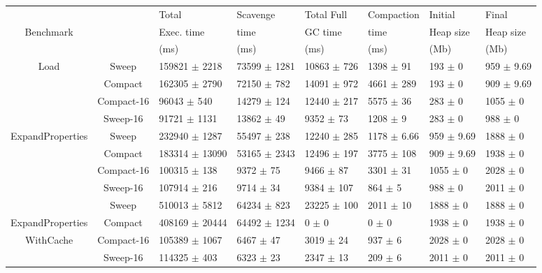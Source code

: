\documentclass[10pt, sigplan]{acmart}
\begin{document}
\begin{figure}[thb]
\begin{tabular}{|c|c|l|l|l|l|l|l|}
   \hline
  & & Total   & Scavenge  & Total Full  & Compaction  & Initial  & Final \\
 Benchmark & &  Exec. time &  time & GC time &  time &  Heap size & Heap size \\
  & &  (ms) &  (ms) & (ms) &  (ms) &  (Mb) &  (Mb) \\
   \hline
   \multirow{4}{*}{Load} & Sweep 	& 159821 $\pm$ 2218 &	73599 $\pm$ 1281 	& 10863 $\pm$ 726 	&1398 $\pm$ 91 	& 193 $\pm$ 0 	& 959 $\pm$ 9.69 \\
    				    & Compact 	& 162305 $\pm$ 2790 &	72150 $\pm$ 782 	& 14091 $\pm$ 972 	&4661 $\pm$ 289 	& 193 $\pm$ 0 	& 909 $\pm$ 9.69 \\
    				    & Compact-16 	& 96043 $\pm$ 540 &	14279 $\pm$ 124 	& 12440 $\pm$ 217 	&5575 $\pm$ 36 	& 283 $\pm$ 0 	& 1055 $\pm$ 0 \\
    				    & Sweep-16 		& 91721 $\pm$ 1131 &	13862 $\pm$ 49 	& 9352 $\pm$ 73 	&1208 $\pm$ 9 	& 283 $\pm$ 0 	& 988 $\pm$ 0 \\
   \hline
   \multirow{4}{*}{ExpandProperties} 	& Sweep 		& 232940 $\pm$ 1287 &	55497 $\pm$ 238 	& 12240 $\pm$ 285 	&1178 $\pm$ 6.66 	& 959 $\pm$ 9.69 & 1888 $\pm$ 0 \\
    				    			& Compact 	& 183314 $\pm$ 13090 &	53165 $\pm$ 2343 	& 12496 $\pm$ 197 	&3775 $\pm$ 108 	& 909 $\pm$ 9.69 & 1938 $\pm$ 0 \\
    				    & Compact-16 	& 100315 $\pm$ 138 &	9372 $\pm$ 75 	& 9466 $\pm$ 87 	&3301 $\pm$ 31 	& 1055 $\pm$ 0 	& 2028 $\pm$ 0 \\
    				    & Sweep-16 		& 107914 $\pm$ 216 &	9714 $\pm$ 34 	& 9384 $\pm$ 107 	&864 $\pm$ 5 	& 988 $\pm$ 0 	& 2011 $\pm$ 0 \\
   \hline
    					& Sweep 		& 510013 $\pm$ 5812 	&	64234 $\pm$ 823 	& 23225 $\pm$ 100 	&2011 $\pm$ 10 	& 1888 $\pm$ 0 	& 1888 $\pm$ 0 \\
     	ExpandProperties	& Compact 	& 408169 $\pm$ 20444 	&	64492 $\pm$ 1234 	& 0 $\pm$ 0 		&0 $\pm$ 0 		& 1938 $\pm$ 0 	& 1938 $\pm$ 0 \\
    		WithCache	& Compact-16 	& 105389 $\pm$ 1067 	&	6467 $\pm$ 47 		& 3019 $\pm$ 24 	&937 $\pm$ 6 		& 2028 $\pm$ 0 	& 2028 $\pm$ 0 \\
    				    	& Sweep-16 	& 114325 $\pm$ 403 	&	6323 $\pm$ 23 		& 2347 $\pm$ 13 	&209 $\pm$ 6 		& 2011 $\pm$ 0 	& 2011 $\pm$ 0 \\

\end{tabular}
\end{figure}
\end{document}

